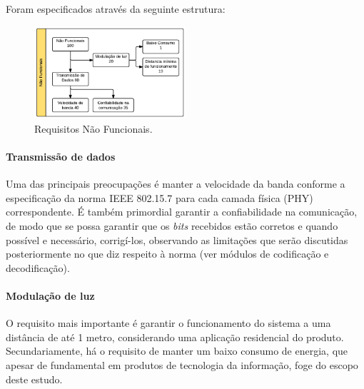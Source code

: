	Foram especificados através da seguinte estrutura:

	\begin{figure}[h!]
		\caption{\label{fig_req2}Requisitos Não Funcionais.}
		\centering
		\includegraphics[width=0.5\textwidth]{Req_Tree_NFunc.pdf}
	\end{figure}

	\paragraph{Transmissão de dados}
	Uma das principais preocupações é manter a velocidade da banda conforme a especificação da norma IEEE 802.15.7 para cada camada física (PHY) correspondente. É também primordial garantir a confiabilidade na comunicação, de modo que se possa garantir que os \textit{bits} recebidos estão corretos e quando possível e necessário, corrigí-los, observando as limitações que serão discutidas posteriormente no que diz respeito à norma (ver módulos de codificação e decodificação).

	\paragraph{Modulação de luz}
	O requisito mais importante é garantir o funcionamento do sistema a uma distância de até 1 metro, considerando uma aplicação residencial do produto. Secundariamente, há o requisito de manter um baixo consumo de energia, que apesar de fundamental em produtos de tecnologia da informação, foge do escopo deste estudo.


